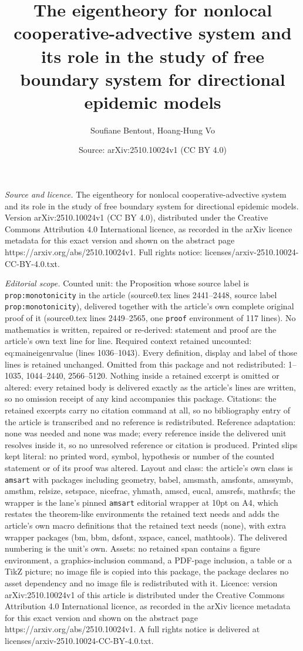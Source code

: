 \documentclass[10pt,a4paper]{amsart}
\title[The eigentheory for nonlocal cooperative-advective system an]{The eigentheory for nonlocal cooperative-advective system and its role in the study of free boundary system for directional epidemic models}
\author{Soufiane Bentout, Hoang-Hung Vo}
\date{Source: arXiv:2510.10024v1 (CC BY 4.0)}
\begin{document}
\maketitle

\noindent\emph{Source and licence.} The eigentheory for nonlocal cooperative-advective system and its role in the study of free boundary system for directional epidemic models. Version arXiv:2510.10024v1 (CC BY 4.0), distributed under the Creative Commons Attribution 4.0 International licence, as recorded in the arXiv licence metadata for this exact version and shown on the abstract page https://arxiv.org/abs/2510.10024v1. Full rights notice: licenses/arxiv-2510.10024-CC-BY-4.0.txt.\par\smallskip

\noindent\textit{Editorial scope.} Counted unit: the Proposition whose source label is \texttt{prop:monotonicity} in the article (source0.tex lines 2441--2448, source label \texttt{prop:monotonicity}), delivered together with the article's own complete original proof of it (source0.tex lines 2449--2565, one \texttt{proof} environment of 117 lines). No mathematics is written, repaired or re-derived: statement and proof are the article's own text line for line. Required context retained uncounted: eq:maineigenrvalue (lines 1036--1043). Every definition, display and label of those lines is retained unchanged. Omitted from this package and not redistributed: 1--1035, 1044--2440, 2566--5120. Nothing inside a retained excerpt is omitted or altered: every retained body is delivered exactly as the article's lines are written, so no omission receipt of any kind accompanies this package. Citations: the retained excerpts carry no citation command at all, so no bibliography entry of the article is transcribed and no reference is redistributed. Reference adaptation: none was needed and none was made; every reference inside the delivered unit resolves inside it, so no unresolved reference or citation is produced. Printed slips kept literal: no printed word, symbol, hypothesis or number of the counted statement or of its proof was altered. Layout and class: the article's own class is \texttt{amsart} with packages including geometry, babel, amsmath, amsfonts, amssymb, amsthm, relsize, setspace, nicefrac, yhmath, amscd, eucal, amsrefs, mathrsfs; the wrapper is the lane's pinned \texttt{amsart} editorial wrapper at 10pt on A4, which restates the theorem-like environments the retained text needs and adds the article's own macro definitions that the retained text needs (none), with extra wrapper packages (bm, bbm, dsfont, xspace, cancel, mathtools). The delivered numbering is the unit's own. Assets: no retained span contains a figure environment, a graphics-inclusion command, a PDF-page inclusion, a table or a TikZ picture; no image file is copied into this package, the package declares no asset dependency and no image file is redistributed with it. Licence: version arXiv:2510.10024v1 of this article is distributed under the Creative Commons Attribution 4.0 International licence, as recorded in the arXiv licence metadata for this exact version and shown on the abstract page https://arxiv.org/abs/2510.10024v1. A full rights notice is delivered at licenses/arxiv-2510.10024-CC-BY-4.0.txt. 
\end{document}
